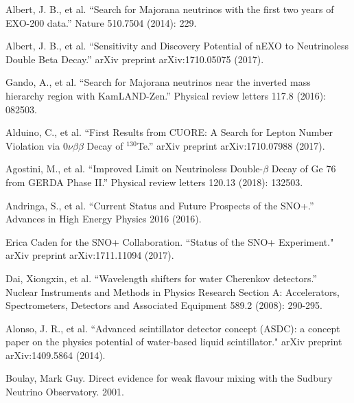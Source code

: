 \documentclass[preprint,12pt]{elsarticle}
\numberwithin{equation}{section}
\begin{document}
\begin{thebibliography}{00}
 Albert, J. B., et al. ``Search for Majorana neutrinos with the first two years of EXO-200 data.'' Nature 510.7504 (2014): 229.

 Albert, J. B., et al. ``Sensitivity and Discovery Potential of nEXO to Neutrinoless Double Beta Decay.'' arXiv preprint arXiv:1710.05075 (2017).


 Gando, A., et al. ``Search for Majorana neutrinos near the inverted mass hierarchy region with KamLAND-Zen.'' Physical review letters 117.8 (2016): 082503.

 Alduino, C., et al. ``First Results from CUORE: A Search for Lepton Number Violation via $0\nu\beta\beta$ Decay of $^{130}$Te.'' arXiv preprint arXiv:1710.07988 (2017).

 Agostini, M., et al. ``Improved Limit on Neutrinoless Double-$\beta$ Decay of Ge 76 from GERDA Phase II.'' Physical review letters 120.13 (2018): 132503.

 Andringa, S., et al. ``Current Status and Future Prospects of the SNO+.'' Advances in High Energy Physics 2016 (2016).

 Erica Caden for the SNO+ Collaboration. ``Status of the SNO+ Experiment." arXiv preprint arXiv:1711.11094 (2017).


 Dai, Xiongxin, et al. ``Wavelength shifters for water Cherenkov detectors.'' Nuclear Instruments and Methods in Physics Research Section A: Accelerators, Spectrometers, Detectors and Associated Equipment 589.2 (2008): 290-295.

 Alonso, J. R., et al. ``Advanced scintillator detector concept (ASDC): a concept paper on the physics potential of water-based liquid scintillator." arXiv preprint arXiv:1409.5864 (2014).

 Boulay, Mark Guy. Direct evidence for weak flavour mixing with the Sudbury Neutrino Observatory. 2001.



\end{thebibliography}
\end{document}
